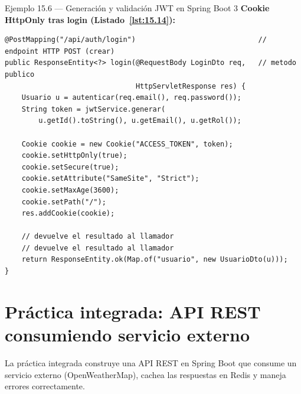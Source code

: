 \documentclass[11pt,a4paper,openany]{book}
\begin{document}
\begin{cajaejemplo}{Ejemplo 15.6 --- Generación y validación JWT en Spring Boot 3}
\textbf{Cookie HttpOnly tras login (Listado~\ref{lst:15.14}):}
\begin{lstlisting}[style=java,numbers=none,caption={Ejemplo de Java},label=lst:15.14]
@PostMapping("/api/auth/login")                             // endpoint HTTP POST (crear)
public ResponseEntity<?> login(@RequestBody LoginDto req,   // metodo publico
                               HttpServletResponse res) {
    Usuario u = autenticar(req.email(), req.password());
    String token = jwtService.generar(
        u.getId().toString(), u.getEmail(), u.getRol());

    Cookie cookie = new Cookie("ACCESS_TOKEN", token);
    cookie.setHttpOnly(true);
    cookie.setSecure(true);
    cookie.setAttribute("SameSite", "Strict");
    cookie.setMaxAge(3600);
    cookie.setPath("/");
    res.addCookie(cookie);

    // devuelve el resultado al llamador
    // devuelve el resultado al llamador
    return ResponseEntity.ok(Map.of("usuario", new UsuarioDto(u)));
}
\end{lstlisting}
\end{cajaejemplo}

\section{Práctica integrada: API REST consumiendo servicio externo}

La práctica integrada construye una API REST en Spring
Boot que consume un servicio externo (OpenWeatherMap), cachea las
respuestas en Redis y maneja errores correctamente.
\end{document}
